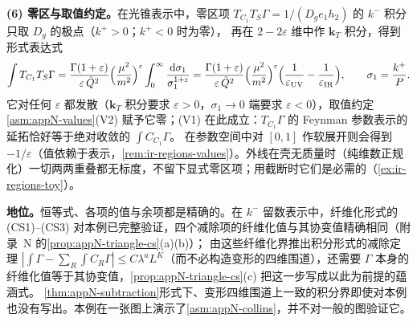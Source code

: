 \begin{example}
\textbf{(6) 零区与取值约定。}在光锥表示中，零区项 $T_{C_1}T_S\Gamma=1/(D_ge_1h_2)$ 的 $k^-$ 积分只取 $D_g$ 的极点（$k^+>0$；$k^+<0$ 时为零），
再在 $2-2\varepsilon$ 维中作 $\mathbf k_T$ 积分，得到形式表达式
\begin{equation}\label{eq:method-zerobin}
\int T_{C_1}T_S\Gamma=\frac{\Gamma(1+\varepsilon)}{\varepsilon\,\tilde Q^2}\Bigl(\frac{\mu^2}{m^2}\Bigr)^{\varepsilon}\int_0^\infty\frac{\mathrm{d}\sigma_1}{\sigma_1^{1+\varepsilon}}
=\frac{\Gamma(1+\varepsilon)}{\varepsilon\,\tilde Q^2}\Bigl(\frac{\mu^2}{m^2}\Bigr)^{\varepsilon}\Bigl(\frac1{\varepsilon_{\rm UV}}-\frac1{\varepsilon_{\rm IR}}\Bigr),\qquad\sigma_1=\frac{k^+}P .
\end{equation}
它对任何 $\varepsilon$ 都发散（$\mathbf k_T$ 积分要求 $\varepsilon>0$，$\sigma_1\to0$ 端要求 $\varepsilon<0$），取值约定\cref{asm:appN-values}(V2) 赋予它零；(V1) 在此成立：$T_{C_1}\Gamma$ 的 Feynman 参数表示的延拓恰好等于绝对收敛的 $\int C_{C_1}\Gamma$。%
在参数空间中对 $[0,1]$ 作软展开则会得到 $-1/\varepsilon$（值依赖于表示，\cref{rem:ir-regions-values}）。外线在壳无质量时（纯维数正规化）一切两两重叠都无标度，不留下显式零区项；用截断时它们是必需的（\cref{ex:ir-regions-toy}）。

\textbf{地位。}恒等式、各项的值与余项都是精确的。在 $k^-$ 留数表示中，纤维化形式的 (CS1)--(CS3) 对本例已完整验证，四个减除项的纤维化值与其协变值精确相同（附录~N 的\cref{prop:appN-triangle-cs}(a)(b)）；
由这些纤维化界推出积分形式的减除定理 $|\int\Gamma-\sum_R\int C_R\Gamma|\le C\lambda^aL^K$（而不必构造变形的四维围道），还需要 $\Gamma$ 本身的纤维化值等于其协变值，\cref{prop:appN-triangle-cs}(c) 把这一步写成以此为前提的蕴涵式。
\cref{thm:appN-subtraction}形式下、变形四维围道上一致的积分界即使对本例也没有写出。本例在一张图上演示了\cref{asm:appN-collins}，并不对一般的图验证它。
\end{example}

